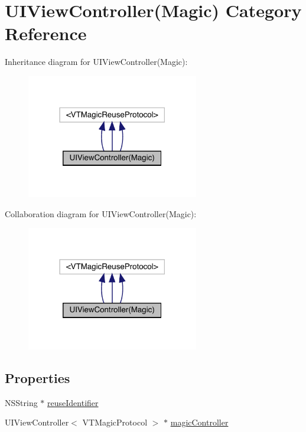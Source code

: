 \hypertarget{category_u_i_view_controller_07_magic_08}{}\section{U\+I\+View\+Controller(Magic) Category Reference}
\label{category_u_i_view_controller_07_magic_08}


Inheritance diagram for U\+I\+View\+Controller(Magic)\+:\nopagebreak
\begin{figure}[H]
\begin{center}
\leavevmode
\includegraphics[width=213pt]{category_u_i_view_controller_07_magic_08__inherit__graph}
\end{center}
\end{figure}


Collaboration diagram for U\+I\+View\+Controller(Magic)\+:\nopagebreak
\begin{figure}[H]
\begin{center}
\leavevmode
\includegraphics[width=213pt]{category_u_i_view_controller_07_magic_08__coll__graph}
\end{center}
\end{figure}
\subsection*{Properties}
\begin{DoxyCompactItemize}
\item 
N\+S\+String $\ast$ \mbox{\hyperlink{category_u_i_view_controller_07_magic_08_a8bcf7d6aa57ed3fa37c7c9f4ffa41af1}{reuse\+Identifier}}
\item 
U\+I\+View\+Controller$<$ V\+T\+Magic\+Protocol $>$ $\ast$ \mbox{\hyperlink{category_u_i_view_controller_07_magic_08_a48f47436e0629fc47ad21b90d6bd2765}{magic\+Controller}}
\end{DoxyCompactItemize}


